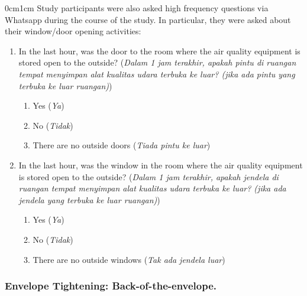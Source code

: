 \documentclass[9pt,twoside]{pnas-new}
\begin{document}
\begin{adjustwidth}{0cm}{1cm}
Study participants were also asked high frequency questions via Whatsapp during the course of the study. In particular, they were asked about their window/door opening activities:
\begin{enumerate}
    \item In the last hour, was the door to the room where the air quality equipment is stored open to the outside? (\textit{Dalam 1 jam terakhir, apakah pintu di ruangan tempat menyimpan alat kualitas udara terbuka ke luar? (jika ada pintu yang terbuka ke luar ruangan)})
    \begin{enumerate}
        \item Yes (\textit{Ya})
        \item No (\textit{Tidak})
        \item There are no outside doors (\textit{Tiada pintu ke luar})
    \end{enumerate}
        \item In the last hour, was the window in the room where the air quality equipment is stored open to the outside? (\textit{Dalam 1 jam terakhir, apakah jendela di ruangan tempat menyimpan alat kualitas udara terbuka ke luar? (jika ada jendela yang terbuka ke luar ruangan)})
    \begin{enumerate}
        \item Yes (\textit{Ya})
        \item No (\textit{Tidak})
        \item There are no outside windows (\textit{Tak ada jendela luar})
    \end{enumerate}
\end{enumerate}

\clearpage


\newpage
\pagebreak 
\subsubsection*{Envelope Tightening: Back-of-the-envelope.}


\end{adjustwidth}
\end{document}
